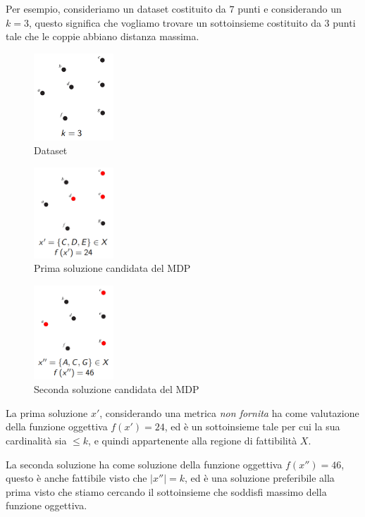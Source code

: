 \documentclass{article}
\begin{document}
Per esempio, consideriamo un dataset costituito da $7$ punti e considerando un $k=3$, questo significa che vogliamo trovare
un sottoinsieme costituito da $3$ punti tale che le coppie abbiano distanza massima.

\begin{figure}[H]
    \centering
    \includegraphics[width=3cm]{images/graph_MDP.png}
    \caption{Dataset}
    \label{fig:graph_MDP}
\end{figure}

\begin{figure}[H]
    \centering
    \includegraphics[width=3cm]{images/sol1_MDP.png}
    \caption{Prima soluzione candidata del MDP}
    \label{fig:cand_sol_MDP}
\end{figure}

\begin{figure}[H]
    \centering
    \includegraphics[width=3cm]{images/sol_MDP.png}
    \caption{Seconda soluzione candidata del MDP}
    \label{fig:cand_sol_2_MDP}
\end{figure}

La prima soluzione $x'$, considerando una metrica \textit{non fornita} ha come valutazione della funzione oggettiva $f(x')=24$, ed è un sottoinsieme tale per cui
la sua cardinalità sia $\leq k$, e quindi appartenente alla regione di fattibilità $X$.

La seconda soluzione ha come soluzione della funzione oggettiva $f(x'')=46$, questo è anche fattibile visto che $|x''|=k$, ed è una soluzione preferibile alla prima visto che
stiamo cercando il sottoinsieme che soddisfi massimo della funzione oggettiva.
\end{document}

